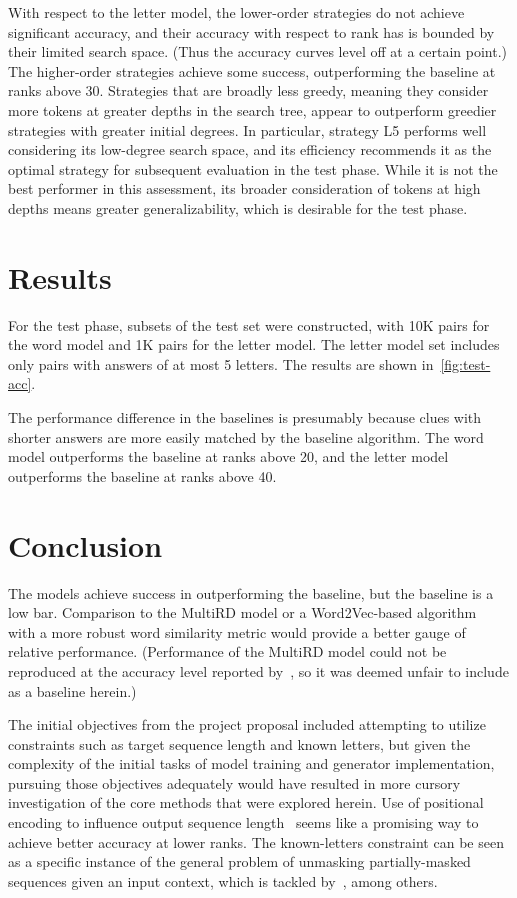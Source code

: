 \documentclass[letterpaper]{article} %
\begin{document}
\begin{NoHyper}
With respect to the letter model, the lower-order strategies do not achieve significant accuracy,
and their accuracy with respect to rank has is bounded by their limited search space.
(Thus the accuracy curves level off at a certain point.)
The higher-order strategies achieve some success, outperforming the baseline at ranks above 30.
Strategies that are broadly less greedy, meaning they consider more tokens at greater depths in the search tree, appear to outperform greedier strategies with greater initial degrees.
In particular, strategy L5 performs well considering its low-degree search space, and its efficiency recommends it as the optimal strategy for subsequent evaluation in the test phase.
While it is not the best performer in this assessment, its broader consideration of tokens at high depths means
greater generalizability, which is desirable for the test phase.

\section{Results}
\label{sec:results}

For the test phase, subsets of the test set were constructed, with 10K pairs
for the word model and 1K pairs for the letter model.
The letter model set includes only pairs with answers of at most 5 letters.
The results are shown in~\autoref{fig:test-acc}.

The performance difference in the baselines is presumably because clues with
shorter answers are more easily matched by the baseline algorithm.
The word model outperforms the baseline at ranks above 20, and the letter model
outperforms the baseline at ranks above 40.

\section{Conclusion}
\label{sec:conclusion}

The models achieve success in outperforming the baseline, but the baseline is a low bar.
Comparison to the MultiRD model or a Word2Vec-based algorithm~\cite{mikolov2013efficient} with a more robust word similarity metric would provide a better gauge of relative performance.
(Performance of the MultiRD model could not be reproduced at the accuracy level reported by~\citeauthor{zhang2019multichannel}, so it was deemed unfair to include as a baseline herein.)

The initial objectives from the project proposal included attempting to utilize constraints such as target sequence
length and known letters, but given the complexity of the initial tasks of model training and generator implementation,
pursuing those objectives adequately would have resulted in more cursory investigation of the core
methods that were explored herein.
Use of positional encoding to influence output sequence length~\cite{takase2019positional} seems like a promising way to achieve better accuracy at lower ranks.
The known-letters constraint can be seen as a specific instance of the general problem of unmasking partially-masked
sequences given an input context, which is tackled by~\citealp{raffel2023exploring}, among others.


\end{NoHyper}
\end{document}
